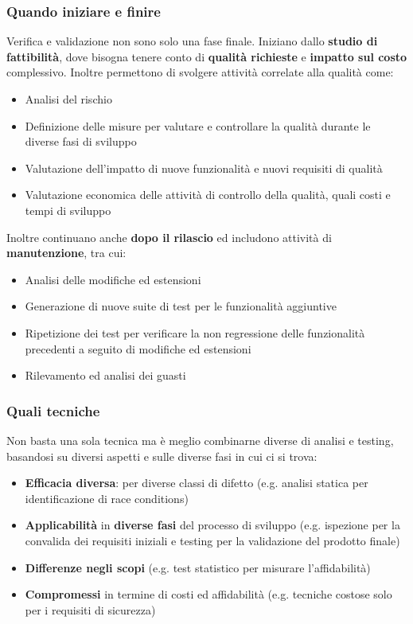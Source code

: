 \subsubsection{Quando iniziare e finire}
Verifica e validazione non sono solo una fase finale. Iniziano dallo \textbf{studio di fattibilità}, dove bisogna tenere conto di \textbf{qualità richieste} e \textbf{impatto sul costo} complessivo. Inoltre permettono di svolgere attività correlate alla qualità come:
\begin{itemize}
	\item Analisi del rischio
	\item Definizione delle misure per valutare e controllare la qualità durante le diverse fasi di sviluppo
	\item Valutazione dell'impatto di nuove funzionalità e nuovi requisiti di qualità
	\item Valutazione economica delle attività di controllo della qualità, quali costi e tempi di sviluppo
\end{itemize}
Inoltre continuano anche \textbf{dopo il rilascio} ed includono attività di \textbf{manutenzione}, tra cui:
\begin{itemize}
	\item Analisi delle modifiche ed estensioni
	\item Generazione di nuove suite di test per le funzionalità aggiuntive
	\item Ripetizione dei test per verificare la non regressione delle funzionalità precedenti a seguito di modifiche ed estensioni
	\item Rilevamento ed analisi dei guasti
\end{itemize}

\subsubsection{Quali tecniche}
Non basta una sola tecnica ma è meglio combinarne diverse di analisi e testing, basandosi su diversi aspetti e sulle diverse fasi in cui ci si trova:
\begin{itemize}
	\item \textbf{Efficacia diversa}: per diverse classi di difetto (e.g. analisi statica per identificazione di race conditions)
	\item \textbf{Applicabilità} in \textbf{diverse fasi} del processo di sviluppo (e.g. ispezione per la convalida dei requisiti iniziali e testing per la validazione del prodotto finale)
	\item \textbf{Differenze negli scopi} (e.g. test statistico per misurare l'affidabilità)
	\item \textbf{Compromessi} in termine di costi ed affidabilità (e.g. tecniche costose solo per i requisiti di sicurezza)
\end{itemize}

